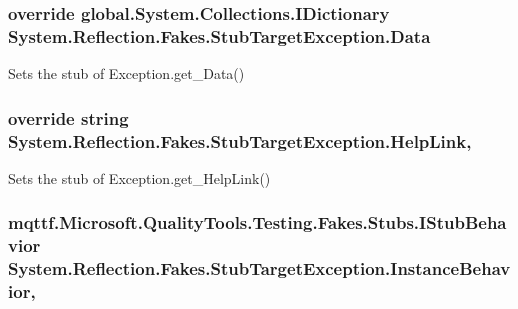 \hypertarget{class_system_1_1_reflection_1_1_fakes_1_1_stub_target_exception_a195706c19bc16f1d6c7c1688634bb793}{
\subsubsection[{Data}]{\setlength{\rightskip}{0pt plus 5cm}override global.\-System.\-Collections.\-I\-Dictionary System.\-Reflection.\-Fakes.\-Stub\-Target\-Exception.\-Data\hspace{0.3cm}{\ttfamily [get]}}}\label{class_system_1_1_reflection_1_1_fakes_1_1_stub_target_exception_a195706c19bc16f1d6c7c1688634bb793}


Sets the stub of Exception.\-get\-\_\-\-Data()

\hypertarget{class_system_1_1_reflection_1_1_fakes_1_1_stub_target_exception_ac9ed8e0c8958ae73f970defceb621bc3}{
\subsubsection[{Help\-Link}]{\setlength{\rightskip}{0pt plus 5cm}override string System.\-Reflection.\-Fakes.\-Stub\-Target\-Exception.\-Help\-Link\hspace{0.3cm}{\ttfamily [get]}, {\ttfamily [set]}}}\label{class_system_1_1_reflection_1_1_fakes_1_1_stub_target_exception_ac9ed8e0c8958ae73f970defceb621bc3}


Sets the stub of Exception.\-get\-\_\-\-Help\-Link()

\hypertarget{class_system_1_1_reflection_1_1_fakes_1_1_stub_target_exception_a1c055f7f5c976b4f12e7707f9f915b00}{
\subsubsection[{Instance\-Behavior}]{\setlength{\rightskip}{0pt plus 5cm}mqttf.\-Microsoft.\-Quality\-Tools.\-Testing.\-Fakes.\-Stubs.\-I\-Stub\-Behavior System.\-Reflection.\-Fakes.\-Stub\-Target\-Exception.\-Instance\-Behavior\hspace{0.3cm}{\ttfamily [get]}, {\ttfamily [set]}}}\label{class_system_1_1_reflection_1_1_fakes_1_1_stub_target_exception_a1c055f7f5c976b4f12e7707f9f915b00}


